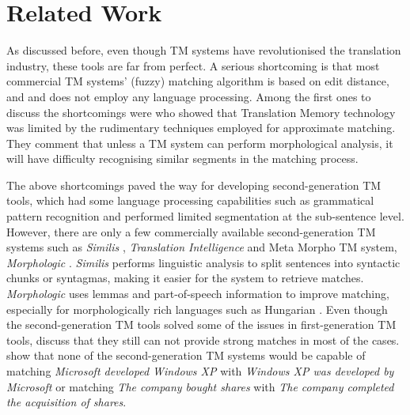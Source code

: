 \section{Related Work}
\label{sec:tm_related}
As discussed before, even though TM systems have revolutionised the translation industry, these tools are far from perfect. A serious shortcoming is that most commercial TM systems' (fuzzy) matching algorithm is based on edit distance, and and does not employ any language processing. Among the first ones to discuss the shortcomings were \textcite{10.5555/648180.749379} who showed that Translation Memory technology was limited by the rudimentary techniques employed for approximate matching.  They comment that unless a TM system can perform morphological analysis, it will have difficulty recognising similar segments in the matching process.

The above shortcomings paved the way for developing second-generation TM tools, which had some language processing capabilities such as grammatical pattern recognition and performed limited segmentation at the sub-sentence level. However, there are only a few commercially available second-generation TM systems such as \textit{Similis} \autocite{planas2005similis}, \textit{Translation Intelligence} \autocite{gronroos2005bringing} and Meta Morpho TM system, \textit{Morphologic} \autocite{hodasz2005metamorpho}. \textit{Similis} \autocite{planas2005similis} performs linguistic analysis to split sentences into syntactic chunks or syntagmas, making it easier for the system to retrieve matches. \textit{Morphologic} uses lemmas and part-of-speech information to improve matching, especially for morphologically rich languages such as Hungarian \autocite{hodasz2005metamorpho}. Even though the second-generation TM tools solved some of the issues in first-generation TM tools, \textcite{mitkov2008improving} discuss that they still can not provide strong matches in most of the cases. \textcite{mitkov2008improving} show that none of the second-generation TM systems would be capable of matching \textit{Microsoft developed Windows XP} with \textit{Windows XP was developed by Microsoft} or matching \textit{The company bought shares} with \textit{The company completed the acquisition of shares}. 


